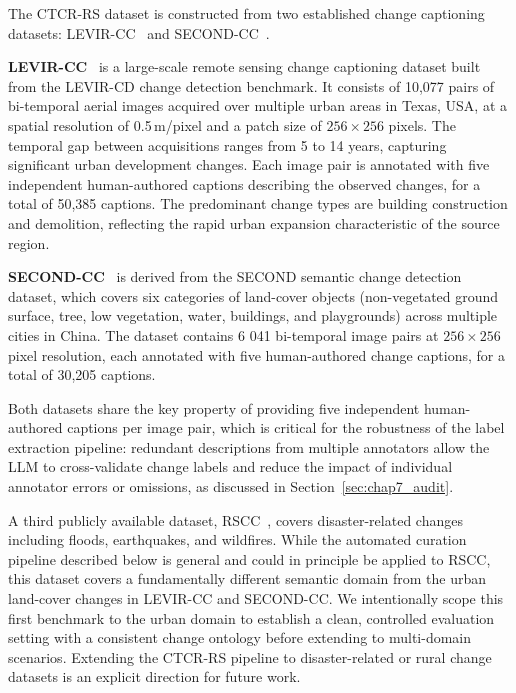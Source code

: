 The CTCR-RS dataset is constructed from two established
change captioning datasets: LEVIR-CC~\cite{liu2022levir}
and SECOND-CC~\cite{karaca2025secondcc}.
 
\textbf{LEVIR-CC}~\cite{liu2022levir} is a large-scale
remote sensing change captioning dataset built from the
LEVIR-CD change detection benchmark. It consists of 10,077
pairs of bi-temporal aerial images acquired over multiple
urban areas in Texas, USA, at a spatial resolution of
0.5\,m/pixel and a patch size of $256 \times 256$ pixels.
The temporal gap between acquisitions ranges from 5 to 14
years, capturing significant urban development changes.
Each image pair is annotated with five independent
human-authored captions describing the observed changes,
for a total of 50,385 captions. The predominant change
types are building construction and demolition, reflecting
the rapid urban expansion characteristic of the source
region.
 
\textbf{SECOND-CC}~\cite{karaca2025secondcc} is derived
from the SECOND semantic change detection dataset, which
covers six categories of land-cover objects (non-vegetated
ground surface, tree, low vegetation, water, buildings, and
playgrounds) across multiple cities in China. The dataset
contains 6 041 bi-temporal image pairs at $256 \times 256$
pixel resolution, each annotated with five human-authored
change captions, for a total of 30,205 captions. 
 
Both datasets share the key property of providing five
independent human-authored captions per image pair, which
is critical for the robustness of the label extraction
pipeline: redundant descriptions from multiple annotators
allow the LLM to cross-validate change labels and reduce
the impact of individual annotator errors or omissions, as
discussed in Section~\ref{sec:chap7_audit}.
 
 
A third publicly available dataset, RSCC~\cite{chen2025rscc},
covers disaster-related changes including floods,
earthquakes, and wildfires. While the automated curation
pipeline described below is general and could in principle
be applied to RSCC, this dataset covers a fundamentally
different semantic domain from the urban land-cover changes
in LEVIR-CC and SECOND-CC. We intentionally scope this
first benchmark to the urban domain to establish a clean,
controlled evaluation setting with a consistent change
ontology before extending to multi-domain scenarios.
Extending the CTCR-RS pipeline to disaster-related or
rural change datasets is an explicit direction for future
work.
 
